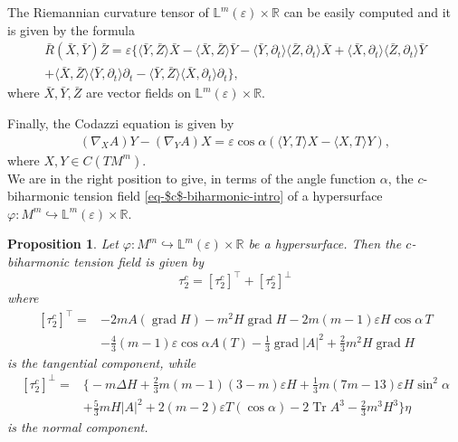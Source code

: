 \documentclass[11pt,leqno]{amsart}
\theoremstyle{plain}
\newtheorem{proposition}  [theorem]  {Proposition}
\theoremstyle{definition}
\numberwithin{equation}{section}
\DeclareMathOperator{\grad}{grad}
\DeclareMathOperator{\trace}{Tr}
\numberwithin{equation}{section}
\begin{document}
{The Riemannian curvature tensor of ${\mathbb L}^m(\varepsilon)\times\mathbb{R}$ can be easily computed and it is given
by the formula
\begin{align}\label{eq:tildeR}
\bar R(\bar X,\bar Y)\bar Z=\varepsilon\{\langle \bar Y,\bar Z\rangle \bar X-\langle \bar X,\bar Z\rangle \bar Y -\langle
\bar Y,\partial_t\rangle\langle \bar Z,\partial_t\rangle \bar X
+\langle \bar X,\partial_t\rangle\langle \bar Z,\partial_t\rangle \bar Y\nonumber\\
+\langle \bar X,\bar Z\rangle\langle \bar Y,\partial_t\rangle \partial_t -\langle
\bar Y,\bar Z\rangle\langle \bar X,\partial_t\rangle \partial_t\},
\end{align}
where $\bar X, \bar Y, \bar Z$ are vector fields on ${\mathbb L}^m(\varepsilon)\times\mathbb{R}$.


Finally, the Codazzi equation is given by
\begin{eqnarray}
\label{eq:Codazzieq} 
(\nabla_XA)Y-(\nabla_YA)X = \varepsilon
\cos\alpha(\langle Y,T\rangle X-\langle X,T\rangle Y),
\end{eqnarray}
where $X,Y\in C(T M^m)$.\\

We are in the right position to give, in terms of the angle function $\alpha$,  the
$c$-biharmonic tension field \eqref{eq-$c$-biharmonic-intro} of a hypersurface  $\varphi:M^{m}\hookrightarrow {\mathbb L}^m(\varepsilon)\times \mathbb{R}$.

\begin{proposition} Let $\varphi:M^{m}\hookrightarrow {\mathbb L}^m(\varepsilon)\times \mathbb{R}$  be a hypersurface. Then the  $c$-biharmonic tension field is given by
$$
\tau_2^c=\left[\tau_2^c\right]^{\top}+\left[\tau_2^c\right]^{\perp}
$$
where
\begin{equation}\label{BHP1}
\begin{aligned}
\left[\tau_2^c\right]^{\top}= & -2 m A( \grad H)-m^2 H \grad H-2 m(m-1) \varepsilon H \cos \alpha\, T \\
& -\frac{4}{3}(m-1) \varepsilon \cos \alpha A(T)-\frac{1}{3} \grad |A|^2+\frac{2}{3} m^2 H \grad H
\end{aligned}
\end{equation}
is the tangential component, while
\begin{equation}\label{BHP2}
\begin{aligned}
\left[\tau_2^c\right]^{\perp} = &\big\{-m \Delta H+\frac{2}{3} m(m-1)(3-m) \varepsilon H+\frac{1}{3} m(7 m-13) \varepsilon H \sin^2 \alpha \\
&+\frac{5}{3} m H |A|^2+2(m-2) \varepsilon T(\cos\alpha) -2 \trace A^3-\frac{2}{3} m^3 H^3 \big\}\eta
\end{aligned}
\end{equation}
is the normal component.
\end{proposition}

}
\end{document}
